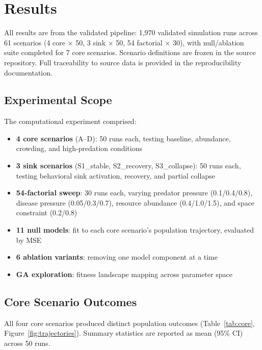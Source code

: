 \section{Results}
\label{sec:results}

All results are from the validated pipeline: 1,970 validated simulation runs across 61 scenarios (4 core $\times$ 50, 3 sink $\times$ 50, 54 factorial $\times$ 30), with null/ablation suite completed for 7 core scenarios. Scenario definitions are frozen in the source repository. Full traceability to source data is provided in the reproducibility documentation.

\subsection{Experimental Scope}

The computational experiment comprised:

\begin{itemize}
\item \textbf{4 core scenarios} (A--D): 50 runs each, testing baseline, abundance, crowding, and high-predation conditions
\item \textbf{3 sink scenarios} (S1\_stable, S2\_recovery, S3\_collapse): 50 runs each, testing behavioral sink activation, recovery, and partial collapse
\item \textbf{54-factorial sweep}: 30 runs each, varying predator pressure (0.1/0.4/0.8), disease pressure (0.05/0.3/0.7), resource abundance (0.4/1.0/1.5), and space constraint (0.2/0.8)
\item \textbf{11 null models}: fit to each core scenario's population trajectory, evaluated by MSE
\item \textbf{6 ablation variants}: removing one model component at a time
\item \textbf{GA exploration}: fitness landscape mapping across parameter space
\end{itemize}

\subsection{Core Scenario Outcomes}
\label{sec:core_outcomes}

All four core scenarios produced distinct population outcomes (Table~\ref{tab:core}, Figure~\ref{fig:trajectories}). Summary statistics are reported as mean (95\% CI) across 50 runs.

